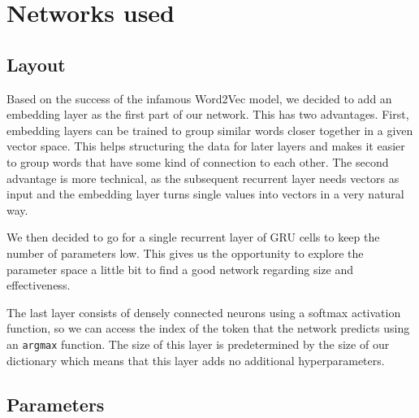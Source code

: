 \section{Networks used}
\label{sec:networks_used}

  \subsection{Layout}
  \label{sub:layout}

    Based on the success of the infamous
    Word2Vec model, we decided to add an embedding layer as the first part of our network. This has two advantages.
    First, embedding layers can be trained to group similar words closer together in a given vector space. This
    helps structuring the data for later layers and makes it easier to group words that have some kind of connection
    to each other. The second advantage is more technical, as the subsequent recurrent layer needs vectors as input
    and the embedding layer turns single values into vectors in a very natural way.

    We then decided to go for a single recurrent layer of GRU cells to keep the number of parameters
    low. This gives us the opportunity to explore the parameter space a little bit to find a good network
    regarding size and effectiveness.

    The last layer consists of densely connected neurons using a softmax activation function, so we can access
    the index of the token that the network predicts using an \verb+argmax+ function. The size of this layer
    is predetermined by the size of our dictionary which means that this layer adds no additional hyperparameters.

  \subsection{Parameters}
  \label{sub:parameters}
  
